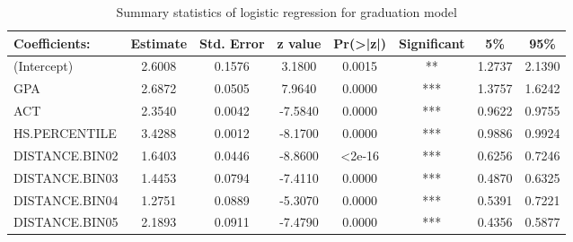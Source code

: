 \documentclass[12pt,english]{report}
\begin{document}
\begin{table}[H]
\centering
\caption{Summary statistics of logistic regression for graduation model}
\label{lr_summary2}
\begin{adjustbox}{width=0.95\textwidth}
\begin{tabular}{|lccccccc|} \hline %
Coefficients:                   & Estimate & Std. Error & z value & Pr(\textgreater|z|) & Significant & 5\%   & 95\%   \\ \hline
(Intercept)                     & 2.6008   & 0.1576     & 3.1800  & 0.0015      & **          & 1.2737 & 2.1390 \\
GPA                             & 2.6872   & 0.0505     & 7.9640  & 0.0000      & ***         & 1.3757 & 1.6242 \\
ACT                             & 2.3540   & 0.0042     & -7.5840 & 0.0000      & ***         & 0.9622 & 0.9755 \\
HS.PERCENTILE                   & 3.4288   & 0.0012     & -8.1700 & 0.0000      & ***         & 0.9886 & 0.9924 \\
DISTANCE.BIN02                  & 1.6403   & 0.0446     & -8.8600 & \textless2e-16     & ***         & 0.6256 & 0.7246 \\
DISTANCE.BIN03                  & 1.4453   & 0.0794     & -7.4110 & 0.0000     & ***         & 0.4870 & 0.6325 \\
DISTANCE.BIN04                  & 1.2751   & 0.0889     & -5.3070 & 0.0000     & ***         & 0.5391 & 0.7221 \\
DISTANCE.BIN05                  & 2.1893   & 0.0911     & -7.4790 & 0.0000     & ***         & 0.4356 & 0.5877 \\

\end{tabular}
\end{adjustbox}
\end{table}
\end{document}
